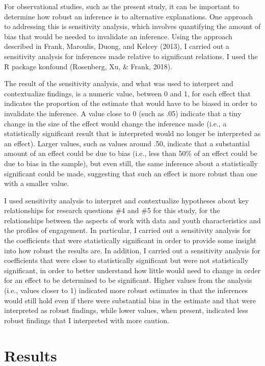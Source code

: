 \documentclass[]{msu-thesis}
\theoremstyle{definition}
\theoremstyle{definition}
\theoremstyle{definition}
\theoremstyle{remark}
\begin{document}
For observational studies, such as the present study, it can be
important to determine how robust an inference is to alternative
explanations. One approach to addressing this is sensitivity analysis,
which involves quantifying the amount of bias that would be needed to
invalidate an inference. Using the approach described in Frank,
Maroulis, Duong, and Kelcey (2013), I carried out a sensitivity analysis
for inferences made relative to significant relations. I used the R
package konfound (Rosenberg, Xu, \& Frank, 2018).

The result of the sensitivity analysis, and what was used to interpret
and contextualize findings, is a numeric value, between 0 and 1, for
each effect that indicates the proportion of the estimate that would
have to be biased in order to invalidate the inference. A value close to
0 (such as .05) indicate that a tiny change in the size of the effect
would change the inference made (i.e., a statistically significant
result that is interpreted would no longer be interpreted as an effect).
Larger values, such as values around .50, indicate that a substantial
amount of an effect could be due to bias (i.e., less than 50\% of an
effect could be due to bias in the sample), but even still, the same
inference about a statistically significant could be made, suggesting
that such an effect is more robust than one with a smaller value.

I used sensitivity analysis to interpret and contextualize hypotheses
about key relationships for research questions \#4 and \#5 for this
study, for the relationships between the aspects of work with data and
youth characteristics and the profiles of engagement. In particular, I
carried out a sensitivity analysis for the coefficients that were
statistically significant in order to provide some insight into how
robust the results are. In addition, I carried out a sensitivity
analysis for coefficients that were close to statistically significant
but were not statistically significant, in order to better understand
how little would need to change in order for an effect to be determined
to be significant. Higher values from the analysis (i.e., values closer
to 1) indicated more robust estimates in that the inferences would still
hold even if there were substantial bias in the estimate and that were
interpreted as robust findings, while lower values, when present,
indicated less robust findings that I interpreted with more caution.

\chapter{Results}\label{results}
\end{document}
